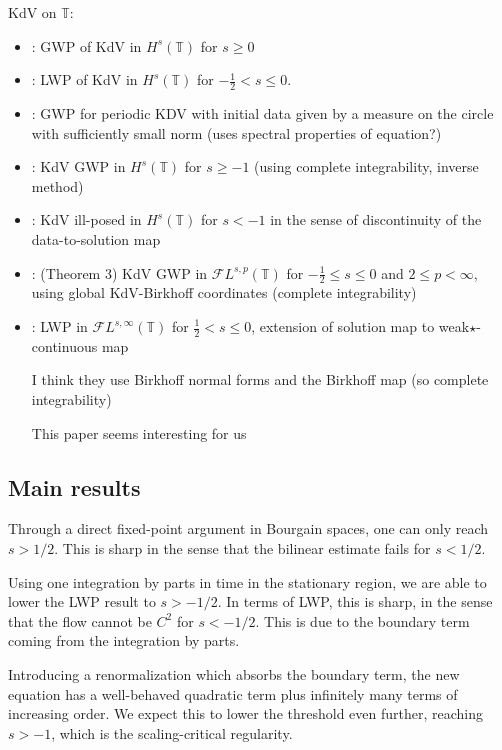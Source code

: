 \documentclass[a4paper, 11pt]{amsart}
\newcommand{\T}{\mathbb{T}}
\theoremstyle{plain}
\theoremstyle{definition}
\theoremstyle{remark}
\newcommand{\5}{\text{V}}
\newcommand{\FL}{\mathcal{F} L}
\numberwithin{equation}{section}
\theoremstyle{mytheoremstyle} \newtheorem{nota}[thm]{Remark}
\theoremstyle{mytheoremstyle} \newtheorem{exemplo}[thm]{Example}
\newcommand{\blue}{\color{blue}}
\begin{document}
KdV on $\T$:


\begin{itemize}

\item \cite{B93}: GWP of KdV in $H^s(\T)$ for $s\ge 0$

\item \cite{KPV96}: LWP of KdV in $H^s(\T)$ for $-\frac12<s\le 0$.

\item \cite{B97}: GWP for periodic KDV with initial data given by a measure on the circle with sufficiently small norm (uses spectral properties of equation?)

\item \cite{KT06}: KdV GWP in $H^s(\T)$ for $s\ge -1$ (using complete integrability, inverse method)

\item \cite{Mol12}: KdV ill-posed in $H^s(\T)$ for $s<-1$ in the sense of discontinuity of the data-to-solution map

\item \cite{KMMT16}: (Theorem 3) KdV GWP in $\FL^{s,p}(\T)$ for $-\frac12 \le s \le 0$ and $2\le p <\infty$, using global KdV-Birkhoff coordinates (complete integrability)


\item \cite{KM18}: LWP in $\FL^{s, \infty}(\T)$ for $\frac12<s\le0$, extension of solution map to weak$\star$-continuous map

I think they use Birkhoff normal forms and the Birkhoff map (so complete integrability)

{\blue This paper seems interesting for us}
\end{itemize}




\subsection{Main results}

Through a direct fixed-point argument in Bourgain spaces, one can only reach $s>1/2$. This is sharp in the sense that the bilinear estimate fails for $s<1/2$.

Using one integration by parts in time in the stationary region, we are able to lower the LWP result to $s>-1/2$. In terms of LWP, this is sharp, in the sense that the flow cannot be $C^2$ for $s<-1/2$. This is due to the boundary term coming from the integration by parts.

Introducing a renormalization which absorbs the boundary term, the new equation has a well-behaved quadratic term plus infinitely many terms of increasing order. We expect this to lower the threshold even further, reaching $s>-1$, which is the scaling-critical regularity.
\end{document}
